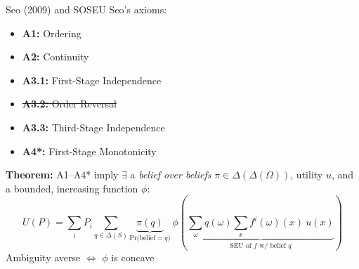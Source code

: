 \begin{frame}{Seo (2009) and SOSEU}
Seo's axioms:
\begin{itemize}
    \item \textbf{A1:} Ordering
    \item \textbf{A2:} Continuity
    \item \textbf{A3.1:} First-Stage Independence
    \item \sout{\textbf{A3.2:} Order Reversal}
    \item \textbf{A3.3:} Third-Stage Independence
    \item \textbf{A4*:} First-Stage Monotonicity
\end{itemize}
\textbf{Theorem:} A1--A4* imply $\exists$ a \textit{belief over beliefs} $\pi\in\Delta(\Delta(\Omega))$, utility $u$, and a bounded, increasing function $\phi$:
$$
    U(P) = \sum_i P_i \sum_{q\in \Delta(S)} \underbrace{\pi(q)}_{\text{Pr(belief}=q\text{)}}\ \phi ( \underbrace{\sum_\omega q(\omega) \sum_x f^i(\omega)(x)\ u(x)}_{\text{SEU of }f\text{ w/ belief }q} )
$$
Ambiguity averse $\iff$ $\phi$ is concave
\end{frame}

